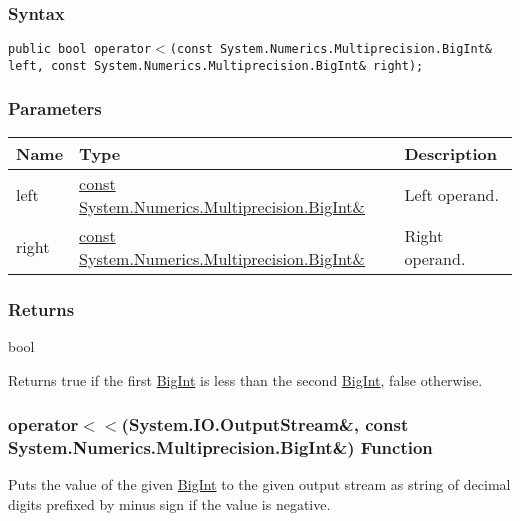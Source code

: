 \documentclass[a4paper,oneside,11.000000pt]{book}
\begin{document}
\subsubsection*{Syntax}
\texttt{public bool operator$<$(const System.Numerics.Multiprecision.BigInt\& left, const System.Numerics.Multiprecision.BigInt\& right);}
\subsubsection*{Parameters}
\begin{flushleft}
\begin{supertabular}[l]{!{\raggedright}p{1.30721cm}!{\raggedright}p{8.55945cm}!{\raggedright}p{3.66839cm}}
\textbf{Name}
& \textbf{Type}
& \textbf{Description}
\\
\hline
left
& \hyperlink{System.Numerics.Multiprecision.BigInt}{const System.\-Numerics.\-Multiprecision.\-BigInt\&\-}
& Left operand.

\\
right
& \hyperlink{System.Numerics.Multiprecision.BigInt}{const System.\-Numerics.\-Multiprecision.\-BigInt\&\-}
& Right operand.

\\
\end{supertabular}

\end{flushleft}
\subsubsection*{Returns}bool
\begin{flushleft}
Returns true if the first \hyperlink{System.Numerics.Multiprecision.BigInt}{BigInt} is less than the second \hyperlink{System.Numerics.Multiprecision.BigInt}{BigInt}, false otherwise.

\end{flushleft}
\clearpage

\hypertarget{System.Numerics.Multiprecision.operator.shiftLeft.R.System.IO.OutputStream.C.R.System.Numerics.Multiprecision.BigInt}{\subsubsection*{operator$<$$<$(System.IO.OutputStream\&, const System.Numerics.Multiprecision.BigInt\&) Function}}
\begin{flushleft}
Puts the value of the given \hyperlink{System.Numerics.Multiprecision.BigInt}{BigInt} to the given output stream as string of decimal digits prefixed by minus sign if the value is negative.

\end{flushleft}
\end{document}
